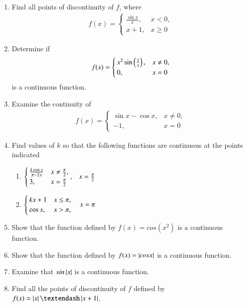 \begin{enumerate}[label=\arabic*.,ref=\thesubsection.\theenumi]
\item Find all points of discontinuity of $f$, where 
\begin{align}
f(x)=
\begin{cases}
\frac{\sin x}{x}, & x < 0,
\\
x+1, & x \ge 0
\end{cases}
\end{align}
\item Determine if 
\begin{align}
f(x)=
\begin{cases}
x^2\sin \left(\frac{1}{x}\right), & x \ne 0,
\\
0, & x = 0
\end{cases}
\end{align}
%
is a continuous function.
\item Examine the continuity of 
\begin{align}
f(x)=
\begin{cases}
\sin x -\cos x, & x \ne 0,
\\
-1, & x = 0
\end{cases}
\end{align}
%
\item Find values of $k$ so that the following functions are continuous at the points indicated
%
\begin{enumerate}
\item 
$
\begin{alignedat}[t]{2}
\begin{cases}
\frac{k\cos x}{\pi - 2x} & x \ne \frac{\pi}{2},
\\
3, & x = \frac{\pi}{2}
\end{cases},
\end{alignedat}
\quad x = \frac{\pi}{2}
$
\item 
$
\begin{alignedat}[t]{2}
\begin{cases}
kx+1 & x \le \pi, 
\\
\cos x, & x > \pi,
\end{cases}
\quad x = \pi
\end{alignedat}
$
\end{enumerate}
%
\item Show that the function defined by $f(x) = cos (x^2 )$ is a continuous function.
\item  Show that the function defined by $f(x) = \left\vert cos x\right\vert $ is a continuous function. 
\item  Examine that $sin \left\vert x\right\vert$ is a continuous function. 
\item  Find all the points of discontinuity of $f$ defined by $f(x) = \abs{ x} – \abs{ x + 1 }$.

\end{enumerate}
